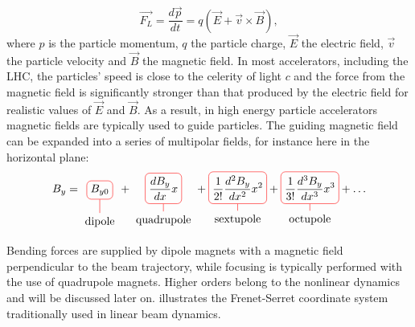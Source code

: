 \begin{equation}
    \vec{F_L}= \dfrac{d\vec{p}}{dt} = q (\vec{E} + \vec{v} \times \vec{B}) ,
    \label{equation:lorentz_force}
\end{equation}
where \(p\) is the particle momentum, \(q\) the particle charge, \(\vec{E}\) the electric field, \(\vec{v}\) the particle velocity and \(\vec{B}\) the magnetic field.
In most accelerators, including the LHC, the particles' speed is close to the celerity of light \(c\) and the force from the magnetic field is significantly stronger than that produced by the electric field for realistic values of \(\vec{E}\) and \(\vec{B}\).
As a result, in high energy particle accelerators magnetic fields are typically used to guide particles.
The guiding magnetic field can be expanded into a series of multipolar fields, for instance here in the horizontal plane:
\begin{align}
    B_{y} = 
    \tikz[baseline]{
        \node[draw=red,rounded corners,anchor=base] (m1)
        {$\displaystyle B_{y0}$};
        \node[below of=m1] (l1) {dipole};
        \draw[-,red] (l1) -- (m1);
    }
    +
    \tikz[baseline]{
        \node[draw=red,rounded corners,anchor=base] (m2)
        {$\displaystyle \frac{dB_{y}}{dx} x$};
        \node[below of=m2] (l2) {quadrupole};
        \draw[-,red] (l2) -- (m2);
    }
    +
    \tikz[baseline]{
        \node[draw=red,rounded corners,anchor=base] (m3)
        {$\displaystyle \frac{1}{2!} \frac{d^2B_{y}}{dx^2} x^2$};
        \node[below of=m3] (l2) {sextupole};
        \draw[-,red] (l2) -- (m3);
    }
    +
    \tikz[baseline]{
        \node[draw=red,rounded corners,anchor=base] (m4)
        {$\displaystyle \frac{1}{3!} \frac{d^3B_{y}}{dx^3} x^3$};
        \node[below of=m4] (l2) {octupole};
        \draw[-,red] (l2) -- (m4);
    }
    + \ldots    
\end{align}

Bending forces are supplied by dipole magnets with a magnetic field perpendicular to the beam trajectory, while focusing is typically performed with the use of quadrupole magnets.
Higher orders belong to the nonlinear dynamics and will be discussed later on.
 illustrates the Frenet-Serret coordinate system traditionally used in linear beam dynamics.
\bigbreak

